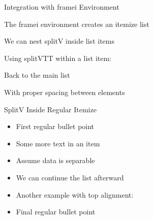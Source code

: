 \documentclass[11pt,compress,t,notes=noshow, xcolor=table]{beamer}
\begin{document}

\begin{framei}[fs=footnotesize,sep=M]{Integration with framei Environment}
  \item The framei environment creates an itemize list
  \item We can nest splitV inside list items
  
  \item Using splitVTT within a list item:
  
  \item Back to the main list
  \item With proper spacing between elements
\end{framei}


\begin{frame}{SplitV Inside Regular Itemize}
  \begin{itemize}
    \item First regular bullet point
    
    \item Some more text in an item
    
    \item Assume data is separable
    \item We can continue the list afterward
    
    \item Another example with top alignment:
    
    \item Final regular bullet point
  \end{itemize}
\end{frame}
\end{document}
